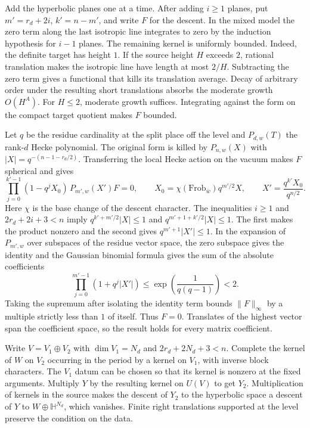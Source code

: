 Add the hyperbolic planes one at a time. After adding \(i\ge1\) planes,
put \(m'=r_d+2i\), \(k'=n-m'\), and write \(F\) for the descent.
In the mixed model the zero term along the last isotropic line integrates
to zero by the induction hypothesis for \(i-1\) planes. The remaining
kernel is uniformly bounded. Indeed, the definite target has height
\(1\). If the source height \(H\) exceeds \(2\), rational translation
makes the isotropic line have length at most \(2/H\). Subtracting the zero
term gives a functional that kills its translation average. Decay of
arbitrary order under the resulting short translations absorbs the moderate
growth \(O(H^A)\). For \(H\le2\), moderate growth suffices. Integrating
against the form on the compact target quotient makes \(F\) bounded.

Let \(q\) be the residue cardinality at the split place off the level and
\(P_{d,w}(T)\) the rank-\(d\) Hecke polynomial. The original form is killed
by \(P_{n,w}(X)\) with \(|X|=q^{-(n-1-r_d/2)}\).
Transferring the local Hecke action on the vacuum makes \(F\) spherical
and gives
\[
 \prod_{j=0}^{k'-1}(1-q^jX_0)\,P_{m',w}(X')F=0,\qquad
 X_0=\chi(\mathrm{Frob}_{\bar w})q^{m'/2}X,\qquad
 X'=\frac{q^{k'}X_0}{q^{n/2}} .
\]
Here \(\chi\) is the base change of the descent character.
The inequalities \(i\ge1\) and \(2r_d+2i+3<n\) imply
\(q^{k'+m'/2}|X|\le1\) and \(q^{m'+1+k'/2}|X|\le1\).
The first makes the product nonzero and the second gives
\(q^{m'+1}|X'|\le1\). In the expansion of \(P_{m',w}\) over subspaces of
the residue vector space, the zero subspace gives the identity and the
Gaussian binomial formula gives the sum of the absolute coefficients
\[
 \prod_{j=0}^{m'-1}(1+q^j|X'|)
 \le\exp\!\left(\frac{1}{q(q-1)}\right)<2 .
\]
Taking the supremum after isolating the identity term bounds
\(\|F\|_\infty\) by a multiple strictly less than \(1\) of itself.
Thus \(F=0\). Translates of the highest vector span the coefficient space,
so the result holds for every matrix coefficient.

Write \(V=V_1\oplus V_2\) with \(\dim V_1=N_d\) and \(2r_d+2N_d+3<n\).
Complete the kernel of \(W\) on \(V_2\) occurring in the period by a kernel
on \(V_1\), with inverse block characters. The \(V_1\) datum can be chosen
so that its kernel is nonzero at the fixed arguments. Multiply \(Y\) by
the resulting kernel on \(U(V)\) to get \(Y_2\). Multiplication of kernels
in the source makes the descent of \(Y_2\) to the hyperbolic space a
descent of \(Y\) to \(W\oplus\mathbb H^{N_d}\), which vanishes.
Finite right translations supported at the level preserve the condition
on the data.

